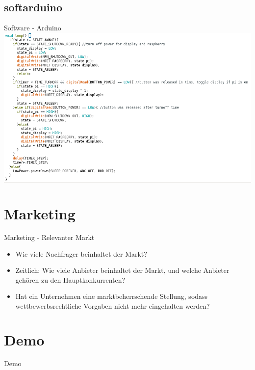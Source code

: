 \documentclass{beamer}
\begin{document}
\subsection{softarduino}

\begin{frame}{Software - Arduino}
\includegraphics[width=145mm]{arduino_loop}
\end{frame}

\section{Marketing}

\begin{frame}{Marketing - Relevanter Markt}
	\begin{itemize}
		\item Wie viele Nachfrager beinhaltet der Markt?
		\item Zeitlich: Wie viele Anbieter beinhaltet der Markt, und welche Anbieter gehören zu den Hauptkonkurrenten?
		\item Hat ein Unternehmen eine marktbeherrschende Stellung, sodass wettbewerbsrechtliche Vorgaben nicht mehr eingehalten werden?
	\end{itemize}
\end{frame}

\section{Demo}
\begin{frame}{Demo}
\end{frame}
\end{document}
